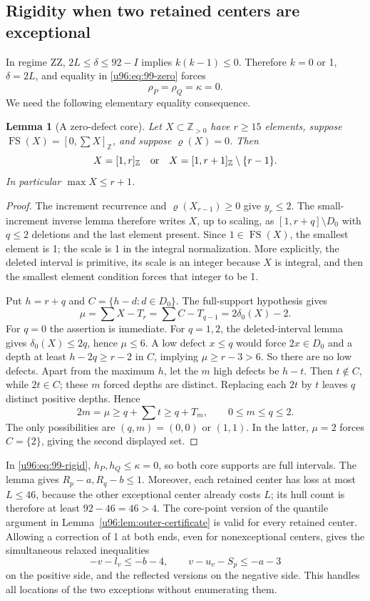 \documentclass[11pt,a4paper]{article}
\newtheorem{lemma}[theorem]{Lemma}
\theoremstyle{remark}
\newcommand{\FS}{\operatorname{FS}}
\newcommand{\rhoD}{\varrho}
\begin{document}
\subsection{Rigidity when two retained centers are exceptional}
In regime ZZ, $2L\leq\delta\leq92-I$ implies $k(k-1)\leq0$.
Therefore $k=0$ or 1, $\delta=2L$, and equality in
\eqref{u96:eq:99-zero} forces
\begin{equation}
 \rho_P=\rho_Q=\kappa=0.\label{u96:eq:99-rigid}
\end{equation}
We need the following elementary equality consequence.

\begin{lemma}[A zero-defect core]\label{u96:lem:zero-core99}
Let $X\subset\mathbb Z_{>0}$ have $r\geq15$ elements, suppose
$\FS(X)=[0,\sum X]_{\mathbb Z}$, and suppose $\rhoD(X)=0$.
Then
\[
 X=[1,r]_{\mathbb Z}\quad\hbox{or}\quad
 X=[1,r+1]_{\mathbb Z}\setminus\{r-1\}.
\]
In particular $\max X\leq r+1$.
\end{lemma}
\begin{proof}
The increment recurrence and $\rhoD(X_{r-1})\geq0$ give $y_r\leq2$.
The small-increment inverse lemma therefore writes $X$, up to scaling,
as $[1,r+q]\setminus D_0$ with $q\leq2$ deletions and the last element
present. Since $1\in\FS(X)$, the smallest element is 1; the scale is 1
in the integral normalization. More explicitly, the deleted interval is
primitive, its scale is an integer because $X$ is integral, and then the
smallest element condition forces that integer to be 1.

Put $h=r+q$ and $C=\{h-d:d\in D_0\}$. The full-support hypothesis gives
\[
 \mu=\sum X-T_r=\sum C-T_{q-1}=2\delta_0(X)-2.
\]
For $q=0$ the assertion is immediate. For $q=1,2$, the deleted-interval
lemma gives $\delta_0(X)\leq2q$, hence $\mu\leq6$.
A low defect $x\leq q$ would force $2x\in D_0$ and a depth at least
$h-2q\geq r-2$ in $C$, implying $\mu\geq r-3>6$.
So there are no low defects. Apart from the maximum $h$, let the $m$
high defects be $h-t$. Then $t\notin C$, while $2t\in C$; these $m$
forced depths are distinct. Replacing each $2t$ by $t$ leaves $q$
distinct positive depths. Hence
\[
 2m=\mu\geq q+\sum t\geq q+T_m,\qquad0\leq m\leq q\leq2.
\]
The only possibilities are $(q,m)=(0,0)$ or $(1,1)$. In the latter,
$\mu=2$ forces $C=\{2\}$, giving the second displayed set.
\end{proof}

In \eqref{u96:eq:99-rigid}, $h_P,h_Q\leq\kappa=0$, so both core supports are
full intervals. The lemma gives $R_p-a,R_q-b\leq1$.
Moreover, each retained center has loss at most $L\leq46$, because the
other exceptional center already costs $L$; its hull count is therefore
at least $92-46=46>4$. The core-point version of the quantile argument
in Lemma~\ref{u96:lem:outer-certificate} is valid for every retained center.
Allowing a correction of 1 at both ends, even for nonexceptional centers,
gives the simultaneous relaxed inequalities
\begin{equation}
 -v-l_v\leq-b-4,\qquad v-u_v-S_p\leq-a-3
 \label{u96:eq:99-two-exception}
\end{equation}
on the positive side, and the reflected versions on the negative side.
This handles all locations of the two exceptions without enumerating them.
\end{document}
